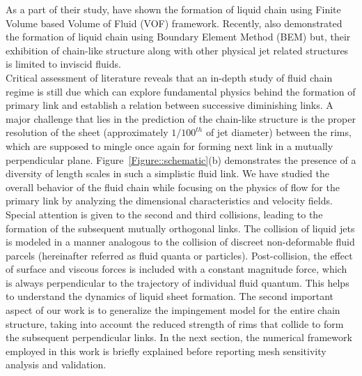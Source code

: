 \documentclass[%
 aip,
 sd,%
amsmath,amssymb,
preprint,%
author-year,%
]{revtex4-1}
\begin{document}
As a part of their study, \cite{chen2013high} have shown the formation of liquid chain using Finite Volume based Volume of Fluid (VOF) framework. Recently, \cite{da2016surface} also demonstrated the formation of liquid chain using Boundary Element Method (BEM) but, their exhibition of chain-like structure along with other physical jet related structures is limited to inviscid fluids.\\
Critical assessment of literature reveals that an in-depth study of fluid chain regime is still due which can explore fundamental physics behind the formation of primary link and establish a relation between successive diminishing links. A major challenge that lies in the prediction of the chain-like structure is the proper resolution of the sheet (approximately $1/100^{th}$ of jet diameter) between the rims, which are supposed to mingle once again for forming next link in a mutually perpendicular plane. Figure~\ref{Figure::schematic}(b) demonstrates the presence of a diversity of length scales in such a simplistic fluid link. We have studied the overall behavior of the fluid chain while focusing on the physics of flow for the primary link by analyzing the dimensional characteristics and velocity fields. Special attention is given to the second and third collisions, leading to the formation of the subsequent mutually orthogonal links. The collision of liquid jets is modeled in a manner analogous to the collision of discreet non-deformable fluid parcels (hereinafter referred as fluid quanta or particles). Post-collision, the effect of surface and viscous forces is included with a constant magnitude force, which is always perpendicular to the trajectory of individual fluid quantum. This helps to understand the dynamics of liquid sheet formation. The second important aspect of our work is to generalize the impingement model for the entire chain structure, taking into account the reduced strength of rims that collide to form the subsequent perpendicular links. In the next section, the numerical framework employed in this work is briefly explained before reporting mesh sensitivity analysis and validation.
\end{document}
